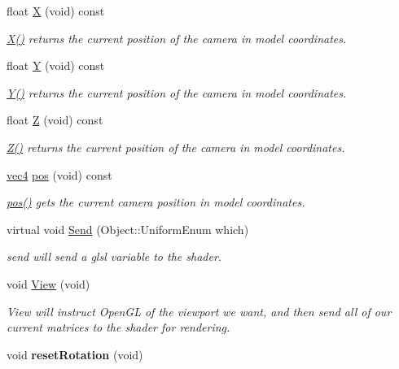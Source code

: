 \begin{DoxyCompactItemize}
float \hyperlink{class_camera_a2f7fd64d5d6e0dfb5edcca53c7d15994}{X} (void) const 
\begin{DoxyCompactList}\small\item\em \hyperlink{class_camera_a2f7fd64d5d6e0dfb5edcca53c7d15994}{X()} returns the current position of the camera in model coordinates. \end{DoxyCompactList}\item 
float \hyperlink{class_camera_a37529ef93871f547ebfd5862bc6cce62}{Y} (void) const 
\begin{DoxyCompactList}\small\item\em \hyperlink{class_camera_a37529ef93871f547ebfd5862bc6cce62}{Y()} returns the current position of the camera in model coordinates. \end{DoxyCompactList}\item 
float \hyperlink{class_camera_abf1730e47e8e51c76acbddcaa85e2475}{Z} (void) const 
\begin{DoxyCompactList}\small\item\em \hyperlink{class_camera_abf1730e47e8e51c76acbddcaa85e2475}{Z()} returns the current position of the camera in model coordinates. \end{DoxyCompactList}\item 
\hyperlink{struct_angel_1_1vec4}{vec4} \hyperlink{class_camera_a9982ac5f48fe0af97fefa725080d6da6}{pos} (void) const 
\begin{DoxyCompactList}\small\item\em \hyperlink{class_camera_a9982ac5f48fe0af97fefa725080d6da6}{pos()} gets the current camera position in model coordinates. \end{DoxyCompactList}\item 
virtual void \hyperlink{class_camera_a9f20ff117467d437779d7b22f6f1ed9d}{Send} (Object\-::\-Uniform\-Enum which)
\begin{DoxyCompactList}\small\item\em send will send a glsl variable to the shader. \end{DoxyCompactList}\item 
void \hyperlink{class_camera_afea07d3100ca3b43655f4021fdece774}{View} (void)
\begin{DoxyCompactList}\small\item\em View will instruct Open\-G\-L of the viewport we want, and then send all of our current matrices to the shader for rendering. \end{DoxyCompactList}\item 
\hypertarget{class_camera_a8ec7938c5e25068e5bff25aeb7038af4}{void {\bfseries reset\-Rotation} (void)}\label{class_camera_a8ec7938c5e25068e5bff25aeb7038af4}


\end{DoxyCompactItemize}
